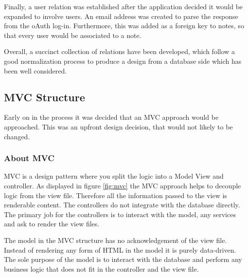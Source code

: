 Finally, a user relation was established after the application decided it would be expanded to involve users. An email address was created to parse the response from the oAuth log-in. Furthermore, this was added as a foreign key to notes, so that every user would be associated to a note.

Overall, a succinct collection of relations have been developed, which follow a good normalization process to produce a design from a database side which has been well considered.



\subsection{MVC Structure}
Early on in the process it was decided that an MVC approach would be approached. This was an upfront design decision, that would not likely to be changed.

\subsubsection{About MVC}
MVC is a design pattern where you split the logic into a Model View and controller. As displayed in figure \ref{fig:mvc} the MVC approach helps to decouple logic from the view file. Therefore all the information passed to the view is renderable content. The controllers do not integrate with the database directly. The primary job for the controllers is to interact with the model, any services and ask to render the view files.

The model in the MVC structure has no acknowledgement of the view file. Instead of rendering any form of HTML in the model it is purely data-driven. The sole purpose of the model is to interact with the database and perform any business logic that does not fit in the controller and the view file.

